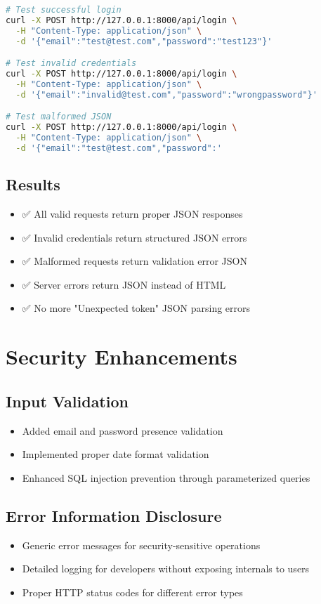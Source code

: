 \documentclass[12pt,a4paper]{article}
\begin{document}
\begin{table}[h]
\begin{lstlisting}[language=bash, caption=API Testing Commands]
# Test successful login  
curl -X POST http://127.0.0.1:8000/api/login \
  -H "Content-Type: application/json" \
  -d '{"email":"test@test.com","password":"test123"}'

# Test invalid credentials
curl -X POST http://127.0.0.1:8000/api/login \
  -H "Content-Type: application/json" \
  -d '{"email":"invalid@test.com","password":"wrongpassword"}'

# Test malformed JSON
curl -X POST http://127.0.0.1:8000/api/login \
  -H "Content-Type: application/json" \
  -d '{"email":"test@test.com","password":'
\end{lstlisting}

\subsection{Results}
\begin{itemize}
    \item ✅ All valid requests return proper JSON responses
    \item ✅ Invalid credentials return structured JSON errors
    \item ✅ Malformed requests return validation error JSON
    \item ✅ Server errors return JSON instead of HTML
    \item ✅ No more "Unexpected token" JSON parsing errors
\end{itemize}

\section{Security Enhancements}

\subsection{Input Validation}
\begin{itemize}
    \item Added email and password presence validation
    \item Implemented proper date format validation
    \item Enhanced SQL injection prevention through parameterized queries
\end{itemize}

\subsection{Error Information Disclosure}
\begin{itemize}
    \item Generic error messages for security-sensitive operations
    \item Detailed logging for developers without exposing internals to users
    \item Proper HTTP status codes for different error types
\end{itemize}


\end{table}
\end{document}
